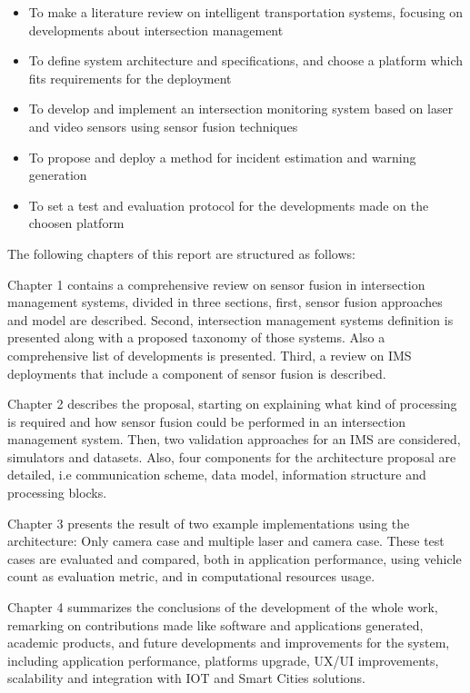\begin{itemize}
\item To make a literature review on intelligent transportation systems, focusing on developments about intersection management
\item To define system architecture and specifications, and choose a platform which fits requirements for the deployment
\item To develop and implement an intersection monitoring system based on laser and video sensors using sensor fusion techniques
\item To propose and deploy a method for incident estimation and warning generation
\item To set a test and evaluation protocol for the developments made on the choosen platform 
\end{itemize}


The following chapters of this report are structured as follows:

Chapter 1 contains a comprehensive review on sensor fusion in intersection management systems, divided in three sections, first, sensor fusion approaches and model are described. Second, intersection management systems definition is presented along with a proposed taxonomy of those systems. Also a comprehensive list of developments is presented. Third, a review on IMS deployments that include a component of sensor fusion is described.

Chapter 2 describes the proposal, starting on explaining what kind of processing is required and how sensor fusion could be performed in an intersection management system. Then, two validation approaches for an IMS are considered, simulators and datasets. Also, four components for the architecture proposal are detailed, i.e communication scheme, data model, information structure and processing blocks.

Chapter 3 presents the result of two example implementations using the architecture: Only camera case and multiple laser and camera case. These test cases are evaluated and compared, both in application performance, using vehicle count as evaluation metric, and in computational resources usage.

Chapter 4 summarizes the conclusions of the development of the whole work, remarking on contributions made like software and applications generated, academic products, and future developments and improvements for the system, including application performance, platforms upgrade, UX/UI improvements, scalability and integration with IOT and Smart Cities solutions.
